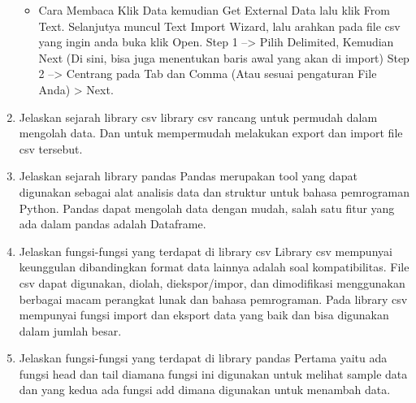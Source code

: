 \begin{enumerate}
\begin{itemize}
        \item Cara Membaca
        Klik Data kemudian Get External Data lalu klik From Text. Selanjutya muncul Text Import Wizard, lalu arahkan pada file csv yang ingin anda buka klik Open. Step 1 –> Pilih Delimited, Kemudian Next (Di sini, bisa juga menentukan baris awal yang akan di import) Step 2 –> Centrang pada Tab dan Comma (Atau sesuai pengaturan File Anda) > Next.
    \end{itemize}
    \item Jelaskan sejarah library csv
    library csv rancang untuk permudah dalam mengolah data. Dan untuk mempermudah melakukan export dan import file csv tersebut.
    \item Jelaskan sejarah library pandas
    Pandas merupakan tool yang dapat digunakan sebagai alat analisis data dan struktur untuk bahasa pemrograman Python. Pandas dapat mengolah data dengan mudah, salah satu fitur yang ada dalam pandas adalah Dataframe.
    \item Jelaskan fungsi-fungsi yang terdapat di library csv
    Library csv mempunyai keunggulan dibandingkan format data lainnya adalah soal kompatibilitas. File csv dapat digunakan, diolah, diekspor/impor, dan dimodifikasi menggunakan berbagai macam perangkat lunak dan bahasa pemrograman. Pada library csv mempunyai fungsi import dan eksport data yang baik dan bisa digunakan dalam jumlah besar.
    \item Jelaskan fungsi-fungsi yang terdapat di library pandas
    Pertama yaitu ada fungsi head dan tail diamana fungsi ini digunakan untuk melihat sample data dan yang kedua ada fungsi add dimana digunakan untuk menambah data.


\end{enumerate}


